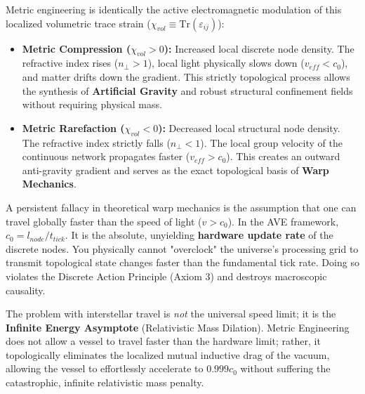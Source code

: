 Metric engineering is identically the active electromagnetic modulation of this localized volumetric trace strain ($\chi_{vol} \equiv \text{Tr}(\varepsilon_{ij})$):
\begin{itemize}
    \item \textbf{Metric Compression ($\chi_{vol} > 0$):} Increased local discrete node density. The refractive index rises ($n_\perp > 1$), local light physically slows down ($v_{eff} < c_0$), and matter drifts down the gradient. This strictly topological process allows the synthesis of \textbf{Artificial Gravity} and robust structural confinement fields without requiring physical mass.
    \item \textbf{Metric Rarefaction ($\chi_{vol} < 0$):} Decreased local structural node density. The refractive index strictly falls ($n_\perp < 1$). The local group velocity of the continuous network propagates faster ($v_{eff} > c_0$). This creates an outward anti-gravity gradient and serves as the exact topological basis of \textbf{Warp Mechanics}.
\end{itemize}

\begin{tcolorbox}[colback=black!5!white, colframe=black!75!white, title=\textbf{Design Note 11.1: The Hardware Causal Limit}]
A persistent fallacy in theoretical warp mechanics is the assumption that one can travel globally faster than the speed of light ($v > c_0$). In the AVE framework, $c_0 = l_{node} / t_{tick}$. It is the absolute, unyielding \textbf{hardware update rate} of the discrete nodes. You physically cannot "overclock" the universe's processing grid to transmit topological state changes faster than the fundamental tick rate. Doing so violates the Discrete Action Principle (Axiom 3) and destroys macroscopic causality.

The problem with interstellar travel is \textit{not} the universal speed limit; it is the \textbf{Infinite Energy Asymptote} (Relativistic Mass Dilation). Metric Engineering does not allow a vessel to travel faster than the hardware limit; rather, it topologically eliminates the localized mutual inductive drag of the vacuum, allowing the vessel to effortlessly accelerate to $0.999c_0$ without suffering the catastrophic, infinite relativistic mass penalty.
\end{tcolorbox}